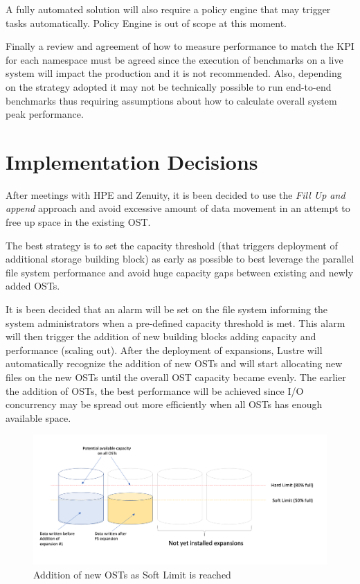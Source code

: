 \documentclass{article}
\begin{document}
A fully automated solution will also require a policy engine that may trigger tasks automatically. Policy Engine is out of scope at this moment. 

Finally a review and agreement of how to measure performance to match the KPI for each namespace must be agreed since the execution of benchmarks on a live system will impact the production and it is not recommended. Also, depending on the strategy adopted it may not be technically possible to run end-to-end benchmarks thus requiring assumptions about how to calculate overall system peak performance.

\section{Implementation Decisions}
After meetings with HPE and Zenuity, it is been decided to use the \textit{Fill Up and append} approach and avoid excessive amount of data movement in an attempt to free up space in the existing OST. 

The best strategy is to set the capacity threshold (that triggers deployment of additional storage building block) as early as possible to best leverage the parallel file system performance and avoid huge capacity gaps between existing and newly added OSTs.

It is been decided that an alarm will be set on the file system informing the system administrators when a pre-defined capacity threshold is met. This alarm will then trigger the addition of new building blocks adding capacity and performance (scaling out). After the deployment of expansions, Lustre will automatically recognize the addition of new OSTs and will start allocating new files on the new OSTs until the overall OST capacity became evenly. The earlier the addition of OSTs, the best performance will be achieved since I/O concurrency may be spread out more efficiently when all OSTs has enough available space. 

\begin{figure}[h]
    \centering
    \includegraphics[scale=0.50]{OST fill up - best case.png}
    \caption{Addition of new OSTs as Soft Limit is reached}
    \label{fig:ost-fillup best case}
\end{figure}
\end{document}
